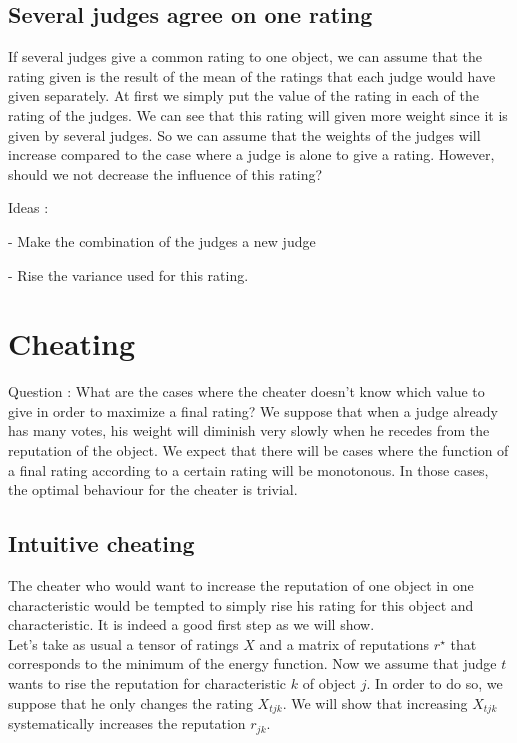 \documentclass[12pt,a4paper]{article}
\begin{document}
\subsection{Several judges agree on one rating}
If several judges give a common rating to one object, we can assume that the rating given is the result of the mean of the ratings that each judge would have given separately. At first we simply put the value of the rating in each of the rating of the judges. We can see that this rating will given more weight since it is given by several judges. So we can assume that the weights of the judges will increase compared to the case where a judge is alone to give a rating. However, should we not decrease the influence of this rating?

Ideas :

- Make the combination of the judges a new judge

- Rise the variance used for this rating.
\section{Cheating}

Question : What are the cases where the cheater doesn't know which value to give in order to maximize a final rating? We suppose that when a judge already has many votes, his weight will diminish very slowly when he recedes from the reputation of the object. We expect that there will be cases where the function of a final rating according to a certain rating will be monotonous. In those cases, the optimal behaviour for the cheater is trivial.

\subsection{Intuitive cheating}
The cheater who would want to increase the reputation of one object in one characteristic would be tempted to simply rise his rating for this object and characteristic. It is indeed a good first step as we will show.\\

Let's take as usual a tensor of ratings $X$ and a matrix of reputations $r^{\star}$ that corresponds to the minimum of the energy function. Now we assume that judge $t$ wants to rise the reputation for characteristic $k$ of object $j$. In order to do so, we suppose that he only changes the rating $X_{tjk}$. We will show that increasing $X_{tjk}$ systematically increases the reputation $r_{jk}$.
\end{document}
